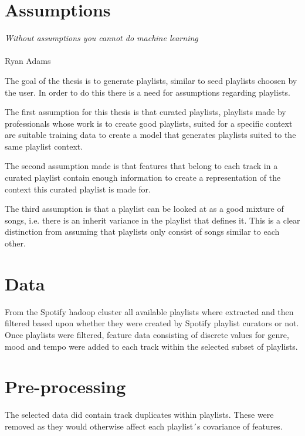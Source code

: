 \documentclass[a4paper,11pt]{kth-mag}
\begin{document}
\section{Assumptions}
\begin{displayquote}
\textit{Without assumptions you cannot do machine learning} \\\\Ryan Adams
\end{displayquote}

The goal of the thesis is to generate playlists, similar to seed playlists choosen by the user. In order to do this there is a need for assumptions regarding playlists.

The first assumption for this thesis is that curated playlists, playlists made by professionals whose work is to create good playlists, suited for a specific context are suitable training data to create a model that generates playlists suited to the same playlist context.

The second assumption made is that features that belong to each track in a curated playlist contain enough information to create a representation of the context this curated playlist is made for.

The third assumption is that a playlist can be looked at as a good mixture of songs, i.e. there is an inherit variance in the playlist that defines it. This is a clear distinction from assuming that playlists only consist of songs similar to each other.


\section{Data}
From the Spotify hadoop cluster all available playlists where extracted and then filtered based upon whether they were created by Spotify playlist curators or not. Once playlists were filtered, feature data consisting of discrete values for genre, mood and tempo were added to each track within the selected subset of playlists.

\section{Pre-processing}
The selected data did contain track duplicates within playlists. These were removed as they would otherwise affect each playlist´s covariance of features.
\end{document}
